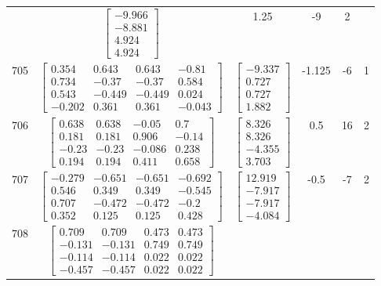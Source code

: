 \documentclass[a4paper,12pt]{article}
\begin{document}
\begin{tabular}{c c c c c c}
&
$\begin{bmatrix} -9.966 \\ -8.881 \\ 4.924 \\ 4.924 \end{bmatrix}$
&
1.25
&
-9
&
2
\\
705
&
$\begin{bmatrix} 0.354 & 0.643 & 0.643 & -0.81 \\ 0.734 & -0.37 & -0.37 & 0.584 \\ 0.543 & -0.449 & -0.449 & 0.024 \\ -0.202 & 0.361 & 0.361 & -0.043 \end{bmatrix}$
&
$\begin{bmatrix} -9.337 \\ 0.727 \\ 0.727 \\ 1.882 \end{bmatrix}$
&
-1.125
&
-6
&
1
\\
706
&
$\begin{bmatrix} 0.638 & 0.638 & -0.05 & 0.7 \\ 0.181 & 0.181 & 0.906 & -0.14 \\ -0.23 & -0.23 & -0.086 & 0.238 \\ 0.194 & 0.194 & 0.411 & 0.658 \end{bmatrix}$
&
$\begin{bmatrix} 8.326 \\ 8.326 \\ -4.355 \\ 3.703 \end{bmatrix}$
&
0.5
&
16
&
2
\\
707
&
$\begin{bmatrix} -0.279 & -0.651 & -0.651 & -0.692 \\ 0.546 & 0.349 & 0.349 & -0.545 \\ 0.707 & -0.472 & -0.472 & -0.2 \\ 0.352 & 0.125 & 0.125 & 0.428 \end{bmatrix}$
&
$\begin{bmatrix} 12.919 \\ -7.917 \\ -7.917 \\ -4.084 \end{bmatrix}$
&
-0.5
&
-7
&
2
\\
708
&
$\begin{bmatrix} 0.709 & 0.709 & 0.473 & 0.473 \\ -0.131 & -0.131 & 0.749 & 0.749 \\ -0.114 & -0.114 & 0.022 & 0.022 \\ -0.457 & -0.457 & 0.022 & 0.022 \end{bmatrix}$

\end{tabular}
\end{document}
